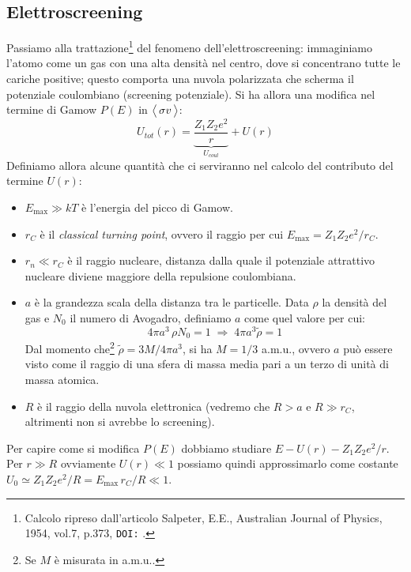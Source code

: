 \subsection{Elettroscreening}\label{0329-sec-screening}
Passiamo alla trattazione\footnote{Calcolo ripreso dall'articolo Salpeter, E.E., Australian Journal of Physics, 1954, vol.7, p.373, \texttt{DOI:} .} del fenomeno dell'elettroscreening: immaginiamo l'atomo come un gas con una alta densità nel centro, dove si concentrano tutte le cariche positive; questo comporta una nuvola polarizzata che scherma il potenziale coulombiano (screening potenziale). Si ha allora una modifica nel termine di Gamow $P(E)$ in $\bigl\langle\, \sigma v\, \bigr\rangle$:
$$U_{tot} (r) = \underbrace{\frac{Z_1Z_2e^2}{r}}_{U_{coul}} + U(r)$$
Definiamo allora alcune quantità che ci serviranno nel calcolo del contributo del termine $U(r)$:
\begin{itemize}
    \item $E_{\max{}}\gg kT$ è l'energia del picco di Gamow.
    \item $r_C$ è il \textit{classical turning point}, ovvero il raggio per cui $E_{\max{}} = Z_1Z_2e^2/r_C$.
    \item $r_n\ll r_C$ è il raggio nucleare, distanza dalla quale il potenziale attrattivo nucleare diviene maggiore della repulsione coulombiana.
    \item $a$ è la grandezza scala della distanza tra le particelle. Data $\rho$ la densità del gas e $N_0$ il numero di Avogadro, definiamo $a$ come quel valore per cui:
    $$4\pi a^3\,\rho N_0 =1 \;\Rightarrow\; 4\pi a^3 \tilde{\rho} = 1$$
    Dal momento che\footnote{Se $M$ è misurata in a.m.u..} $\tilde{\rho} = 3M/4\pi a^3$, si ha $M= 1/3$ a.m.u., ovvero $a$ può essere visto come il raggio di una sfera di massa media pari a un terzo di unità di massa atomica.
    \item $R$ è il raggio della nuvola elettronica (vedremo che $R>a$ e $R\gg r_C$, altrimenti non si avrebbe lo screening).
\end{itemize}
Per capire come si modifica $P(E)$ dobbiamo studiare $E-U(r)-Z_1Z_2e^2/r$. Per $r\gg R$ ovviamente $U(r)\ll 1$ possiamo quindi approssimarlo come costante $U_0 \simeq Z_1Z_2e^2/R = E_{\max{}}\, r_C/R\ll1$.
